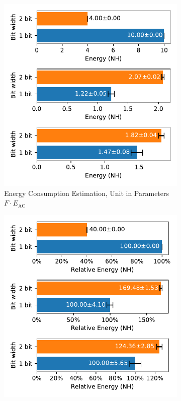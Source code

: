         \begin{figure}[H]
            \centering
            \begin{subfigure}[H]{0.495\textwidth}
                \includegraphics[width=\textwidth]{../timesteps/CIFAR10/plots/cifar10_test_energy_nh.pdf}
                \caption{Energy Consumption Estimation, Unit in Parameters $F\cdot E_{\text{AC}}$}
            \end{subfigure}
            \hfill
            \begin{subfigure}[H]{0.495\textwidth}
                \includegraphics[width=\textwidth]{../timesteps/CIFAR10/plots/cifar10_test_relative_energy_nh.pdf}

\end{subfigure}
\end{figure}
